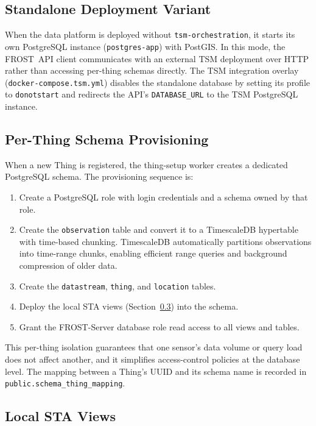 \subsection{Standalone Deployment Variant}
\label{sec:arch-db-standalone}

When the data platform is deployed without \texttt{tsm-orchestration}, it starts its own
PostgreSQL instance (\texttt{postgres-app}) with PostGIS. In this mode, the FROST~API client
communicates with an external TSM deployment over HTTP rather than accessing per-thing schemas
directly. The TSM integration overlay (\texttt{docker-compose.tsm.yml}) disables the standalone
database by setting its profile to \texttt{donotstart} and redirects the API's
\texttt{DATABASE\_URL} to the TSM PostgreSQL instance.

\subsection{Per-Thing Schema Provisioning}
\label{sec:arch-db-perthings}

When a new Thing is registered, the thing-setup worker creates a dedicated PostgreSQL schema.
The provisioning sequence is:

\begin{enumerate}
  \item Create a PostgreSQL role with login credentials and a schema owned by that role.
  \item Create the \texttt{observation} table and convert it to a TimescaleDB hypertable
        with time-based chunking. TimescaleDB automatically partitions observations into
        time-range chunks, enabling efficient range queries and background compression
        of older data.
  \item Create the \texttt{datastream}, \texttt{thing}, and \texttt{location} tables.
  \item Deploy the local STA views (Section~\ref{sec:arch-db-staviews}) into the schema.
  \item Grant the FROST-Server database role read access to all views and tables.
\end{enumerate}

This per-thing isolation guarantees that one sensor's data volume or query load does not
affect another, and it simplifies access-control policies at the database level. The mapping
between a Thing's UUID and its schema name is recorded in
\texttt{public.schema\_thing\_mapping}.

\subsection{Local STA Views}
\label{sec:arch-db-staviews}

